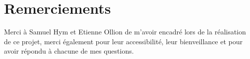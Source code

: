 \section*{Remerciements}

Merci à Samuel Hym et Etienne Ollion de m'avoir encadré lors de la réalisation de ce projet, merci également pour leur accessibilité, leur bienveillance et pour avoir répondu à chacune de mes questions.
